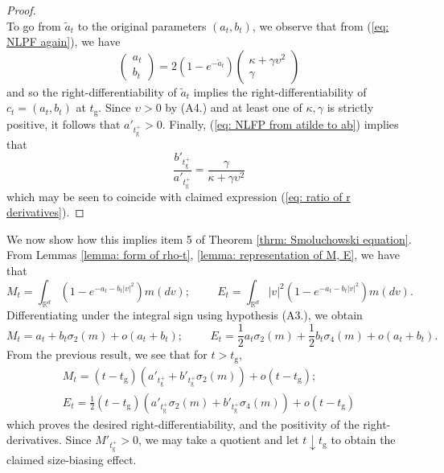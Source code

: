 \documentclass[11pt, notitlepage]{article}
\begin{document}
\begin{proof}
\begin{equation}
 \end{equation} To go from $\widetilde{a}_t$ to the original parameters $(a_t, b_t)$, we observe that from (\ref{eq: NLPF again}), we have \begin{equation}\label{eq: NLFP from atilde to ab} \left(\begin{matrix} a_t\\b_t \end{matrix}\right)=2(1-e^{-\widetilde{a}_t})\left(\begin{matrix} \kappa+\gamma\upsilon^2 \\ \gamma \end{matrix}\right) \end{equation} and so the right-differentiability of $\widetilde{a}_t$ implies the right-differentiability of $c_t=(a_t, b_t)$ at $t_\mathrm{g}.$ Since $\upsilon>0$ by (A4.) and at least one of $\kappa, \gamma$ is strictly positive, it follows that $a'_{t_\mathrm{g}^+}>0$. Finally, (\ref{eq: NLFP from atilde to ab}) implies that \begin{equation} \frac{b'_{t_\mathrm{g}^+}}{a'_{t_\mathrm{g}^+}}=\frac{\gamma}{\kappa+\gamma\upsilon^2} \end{equation} which may be seen to coincide with claimed expression (\ref{eq: ratio of r derivatives}). \end{proof} We now show how this implies item 5 of Theorem \ref{thrm: Smoluchowski equation}. From  Lemmas \ref{lemma: form of rho-t}, \ref{lemma: representation of M, E}, we have that \begin{equation} M_t=\int_{\mathbb{R}^d}(1-e^{-a_t-b_t|v|^2})m(dv); \hspace{1cm} E_t=\int_{\mathbb{R}^d}|v|^2(1-e^{-a_t-b_t|v|^2})m(dv). \end{equation} Differentiating under the integral sign using hypothesis (A3.), we obtain \begin{equation}
    M_t=a_t+b_t\sigma_2(m)+o(a_t+b_t); \hspace{1cm} E_t=\frac{1}{2}a_t\sigma_2(m)+\frac{1}{2}b_t\sigma_4(m)+o(a_t+b_t).
\end{equation} From the previous result, we see that for $t>t_\mathrm{g}$, \begin{gather} M_t=(t-t_\mathrm{g})(a'_{t_\mathrm{g}^+}+b'_{t_\mathrm{g}^+}\sigma_2(m))+o(t-t_\mathrm{g}); \\[1ex] E_t=\frac{1}{2}(t-t_\mathrm{g})(a'_{t_\mathrm{g}^+}\sigma_2(m)+b'_{t_\mathrm{g}^+}\sigma_4(m))+o(t-t_\mathrm{g})\end{gather} which proves the desired right-differentiability, and the positivity of the right-derivatives. Since $M'_{t_\mathrm{g}^+}>0$, we may take a quotient and let $t\downarrow t_\mathrm{g}$ to obtain the claimed size-biasing effect. 
\end{document}
